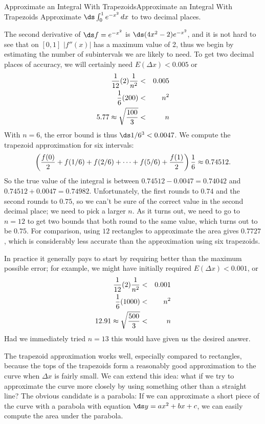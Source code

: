 \begin{example}{Approximate an Integral With Trapezoids}{Approximate an Integral With Trapezoids}\label{Approximate an Integral With Trapezoids}
Approximate $\ds\int_0^1 e^{-x^2}\,dx$ to two decimal places.
\end{example}

\begin{solution}
The second derivative of $\ds f=e^{-x^2}$ is $\ds(4x^2-2)e^{-x^2}$, and
it is not hard to see that on $[0,1]$ $|f''(x)|$ has a maximum value of 2, thus
we begin by estimating the number of subintervals we are likely to
need. To get two decimal places of accuracy, we will certainly need
$E(\Delta x)<0.005$ or
\begin{eqnarray*}
  {1\over12}(2){1\over n^2} &<& 0.005\cr
  {1\over6}(200)&<&n^2\cr
  5.77\approx\sqrt{100\over3}&<&n
\end{eqnarray*}
With $n=6$, the error bound is thus $\ds1/6^3<0.0047$.
We compute the trapezoid approximation for six intervals:
$$
  \left({f(0)\over2}+f(1/6)+f(2/6)+\cdots+f(5/6)+{f(1)\over2}\right){1\over6}
  \approx 0.74512.
$$
So the true value of the integral is between $0.74512-0.0047=0.74042$ and
$0.74512+0.0047=0.74982$. Unfortunately, the first rounds to $0.74$
and the second 
rounds to $0.75$, so we can't be sure of the correct value in
the second decimal place; we need to pick a larger $n$.
As it turns out, we need to go to $n=12$ to get two bounds that both
round to the same value, which turns out to be $0.75$. For comparison,
using $12$ rectangles to approximate the area gives $0.7727$, which is
considerably less accurate than the approximation using six trapezoids.

In practice it
generally pays to start by requiring better than the maximum possible
error; for example, we might have initially required $E(\Delta
x)<0.001$, or 
\begin{eqnarray*}
  {1\over12}(2){1\over n^2} &<& 0.001\cr
  {1\over6}(1000)&<&n^2\cr
  12.91\approx\sqrt{500\over3}&<&n
\end{eqnarray*}
Had we immediately tried $n=13$ this would have given us the desired
answer. 
\end{solution}

The trapezoid approximation works well, especially compared to
rectangles, because the tops of the trapezoids form a reasonably good
approximation to the curve when $\Delta x$ is fairly small. We can
extend this idea: what if we try to approximate the curve more
closely by using something other than a straight line? The obvious
candidate is a parabola: If we can approximate a short piece of the
curve with a parabola with equation $\ds y=ax^2+bx+c$, we can easily
compute the area under the parabola.

